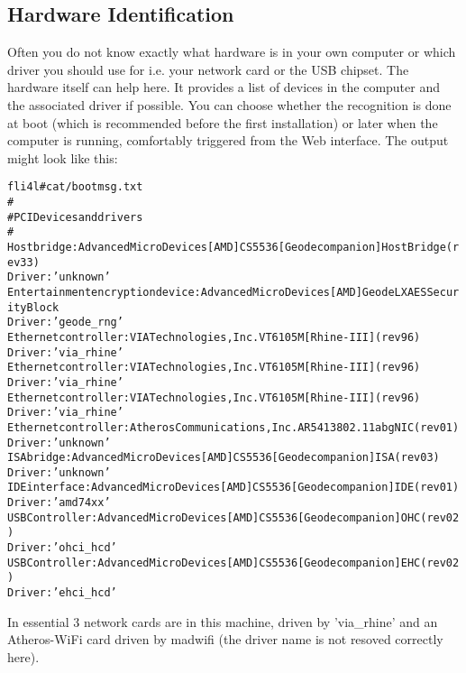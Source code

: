 \subsection{Hardware Identification}

Often you do not know exactly what hardware is in your own computer
or which driver you should use for i.e. your network card or the USB
chipset. The hardware itself can help here. It provides a list of
devices in the computer and the associated driver if possible. You
can choose whether the recognition is done at boot (which is recommended
before the first installation) or later when the computer is running,
comfortably triggered from the Web interface. The output might look
like this:

\begin{example}
\begin{alltt}
fli4l \version # cat /bootmsg.txt
#
# PCI Devices and drivers
#
Host bridge: Advanced Micro Devices [AMD] CS5536 [Geode companion] Host Bridge (rev 33)
Driver: 'unknown'
Entertainment encryption device: Advanced Micro Devices [AMD] Geode LX AES Security Block
Driver: 'geode_rng'
Ethernet controller: VIA Technologies, Inc. VT6105M [Rhine-III] (rev 96)
Driver: 'via_rhine'
Ethernet controller: VIA Technologies, Inc. VT6105M [Rhine-III] (rev 96)
Driver: 'via_rhine'
Ethernet controller: VIA Technologies, Inc. VT6105M [Rhine-III] (rev 96)
Driver: 'via_rhine'
Ethernet controller: Atheros Communications, Inc. AR5413 802.11abg NIC (rev 01)
Driver: 'unknown'
ISA bridge: Advanced Micro Devices [AMD] CS5536 [Geode companion] ISA (rev 03)
Driver: 'unknown'
IDE interface: Advanced Micro Devices [AMD] CS5536 [Geode companion] IDE (rev 01)
Driver: 'amd74xx'
USB Controller: Advanced Micro Devices [AMD] CS5536 [Geode companion] OHC (rev 02)
Driver: 'ohci_hcd'
USB Controller: Advanced Micro Devices [AMD] CS5536 [Geode companion] EHC (rev 02)
Driver: 'ehci_hcd'
\end{alltt}
\end{example}

In essential 3 network cards are in this machine, driven by 'via\_rhine'
and an Atheros-WiFi card driven by madwifi (the driver name is not resoved
correctly here).

